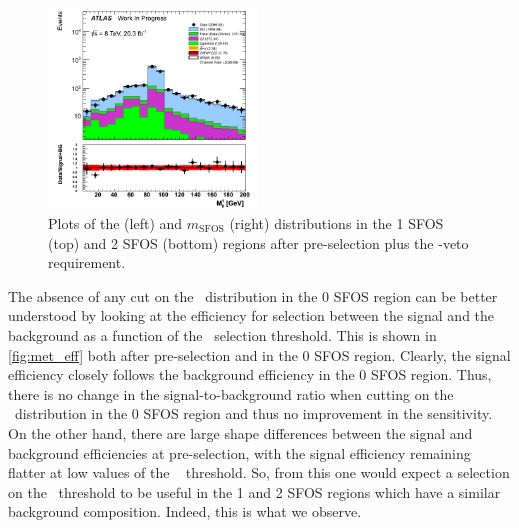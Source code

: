 \begin{figure}[ht!]
\includegraphics[width=0.495\textwidth]{figures/appendix_signal_selection/Nov24Update_FakeSys_KFacSys_LogY_NoRebin/output/jobs/MxM/DataFull_Rates_May13_FakeRatesExactly2Loose_MuonMxMBJetGt0_ElBJetGt0SubtractPC_MxM/PreselectionNov23_15_2SFOS_ChargeAbs1_BVeto85_physics/weight_all/png/InvariantMassSFOS_histratio.png}
\caption{Plots of the \MET (left) and $m_{\textrm{SFOS}}$ (right) distributions 
in the 1 SFOS (top) and 2 SFOS (bottom) regions after pre-selection
plus the \bee-veto requirement.}
\label{fig:met_zwindow_optimization}
\end{figure}

The absence of any cut on the \MET~distribution in the 0 SFOS
region can be better understood by looking at 
the efficiency for selection between 
the signal and the background as a function of the \MET~selection threshold.
This is shown in \fig\ref{fig:met_eff} both after pre-selection
and in the 0 SFOS region.
Clearly, the signal efficiency closely follows the background efficiency
in the 0 SFOS region. Thus, there is no change in the
signal-to-background ratio when cutting on the \MET~distribution
in the 0 SFOS region and thus no improvement in the sensitivity.
On the other hand, there are large shape differences 
between the signal
and background efficiencies at pre-selection, with the 
signal efficiency remaining flatter at low values of the \MET~
threshold. So, from this one would expect a selection
on the \MET~threshold to be useful in the 1 and 2 SFOS
regions which have a similar background composition. 
Indeed, this is what we observe.


